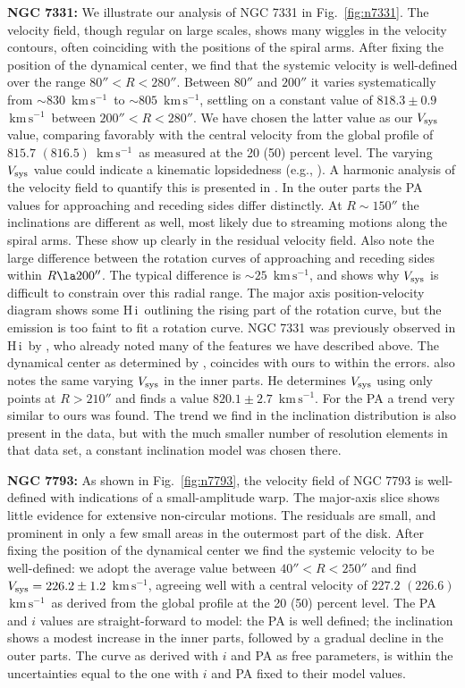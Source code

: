 \documentclass[usenatbib,usegraphicx,apjfonts,floatfix]{emulateapj}
\newcommand{\kms}{\ensuremath{\,\mbox{km}\,\mbox{s}^{-1}}}
\newcommand{\HI}{H\,{\sc i}}
\begin{document}
{\bf NGC 7331:} We illustrate our analysis of NGC 7331 in
Fig.~\ref{fig:n7331}.  The velocity field, though regular on large
scales, shows many wiggles in the velocity contours, often coinciding
with the positions of the spiral arms.
After fixing the position of the dynamical center, we find that the
systemic velocity is well-defined over the range
$80''<R<280''$. Between $80''$ and $200''$ it varies systematically
from $\sim 830$ \kms\ to $\sim 805$ \kms, settling on a constant
value of $818.3 \pm 0.9$ \kms\ between $200'' < R < 280''$. We have
chosen the latter value as our $V_{\rm sys}$ value, comparing
favorably with the central velocity from the global profile of $815.7$
$(816.5)$ \kms\ as measured at the 20 (50) percent level.  The
varying $V_{\rm sys}$ value could indicate a kinematic lopsidedness
(e.g., \citealt{remco97,remco}). A harmonic analysis of the velocity field to
quantify this is presented in \citet{clemens2007}.
In the outer parts the PA values for approaching and receding sides
differ distinctly.  At $R\sim 150''$ the inclinations are different as
well, most likely due to streaming motions along the spiral
arms. These show up clearly in the residual velocity field. Also note
the large difference between the rotation curves of approaching and
receding sides within $R \la 200''$. The typical difference is $\sim
25$ \kms, and shows why $V_{\rm sys}$ is difficult to constrain over
this radial range.  The major axis position-velocity diagram shows
some \HI\ outlining the rising part of the rotation curve, but the
emission is too faint to fit a rotation curve.
NGC 7331 was previously observed in \HI\ by \citet{begeman87}, who
already noted many of the features we have described above.  The
dynamical center as determined by \citet{begeman87}, coincides with
ours to within the errors.  \citet{begeman87} also notes the same
varying $V_{\rm sys}$ in the inner parts. He determines $V_{\rm sys}$
using only points at $R>210''$ and finds a value $820.1 \pm 2.7$ \kms.
For the PA a trend very similar to ours was found. The trend we find
in the inclination distribution is also present in the
\citet{begeman87} data, but with the much smaller number of resolution
elements in that data set, a constant inclination model was chosen
there.

{\bf NGC 7793: } As shown in Fig.~\ref{fig:n7793}, the velocity field
of NGC 7793 is well-defined with indications of a small-amplitude
warp.  The major-axis slice shows little evidence for extensive
non-circular motions. The residuals are small, and prominent in only a
few small areas in the outermost part of the disk.  After fixing the
position of the dynamical center we find the systemic velocity to be
well-defined: we adopt the average value between $40'' < R < 250''$
and find $V_{\rm sys} = 226.2 \pm 1.2$ \kms, agreeing well with a
central velocity of $227.2$ $(226.6)$ \kms\ as derived from the global
profile at the 20 (50) percent level.  The PA and $i$ values are
straight-forward to model: the PA is well defined; the inclination
shows a modest increase in the inner parts, followed by a gradual
decline in the outer parts.  The curve as derived with $i$ and PA as
free parameters, is within the uncertainties equal to the one with $i$
and PA fixed to their model values.
\end{document}
